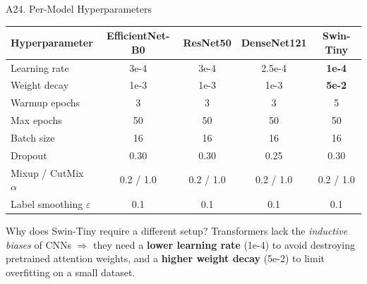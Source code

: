 \documentclass[10pt, aspectratio=169]{beamer}
\begin{document}
\begin{frame}{A24. Per-Model Hyperparameters}
    \scriptsize
    \begin{table}[]
        \centering
        \begin{tabular}{lcccc}
        \toprule
        \rowcolor{usthblue!25}
        \textbf{Hyperparameter} & \textbf{EfficientNet-B0} & \textbf{ResNet50} & \textbf{DenseNet121} & \textbf{Swin-Tiny} \\
        \midrule
        Learning rate       & 3e-4  & 3e-4 & 2.5e-4 & \textbf{1e-4} \\
        Weight decay        & 1e-3  & 1e-3 & 1e-3   & \textbf{5e-2} \\
        Warmup epochs       & 3     & 3    & 3      & 5 \\
        Max epochs          & 50    & 50   & 50     & 50 \\
        Batch size          & 16    & 16   & 16     & 16 \\
        Dropout             & 0.30  & 0.30 & 0.25   & 0.30 \\
        Mixup / CutMix $\alpha$ & 0.2 / 1.0 & 0.2 / 1.0 & 0.2 / 1.0 & 0.2 / 1.0 \\
        Label smoothing $\varepsilon$ & 0.1 & 0.1 & 0.1 & 0.1 \\
        \bottomrule
        \end{tabular}
    \end{table}

    \vspace{0.3cm}
    \begin{block}{Why does Swin-Tiny require a different setup?}
        \footnotesize
        Transformers lack the \textit{inductive biases} of CNNs $\Rightarrow$ they need a \textbf{lower learning rate} (1e-4) to avoid destroying pretrained attention weights, and a \textbf{higher weight decay} (5e-2) to limit overfitting on a small dataset.
    \end{block}
\end{frame}
\end{document}
